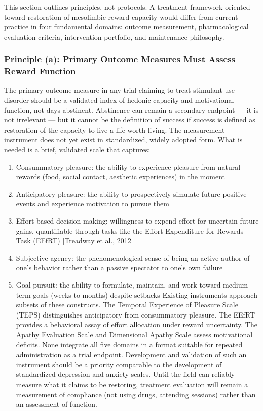 This section outlines principles, not protocols. A treatment framework oriented toward restoration of mesolimbic reward capacity would differ from current practice in four fundamental domains: outcome measurement, pharmacological evaluation criteria, intervention portfolio, and maintenance philosophy.

\subsubsection{Principle (a): Primary Outcome Measures Must Assess Reward Function}\label{18_restoration-principle-a-primary-outcome-measures-must-assess-reward-function}

The primary outcome measure in any trial claiming to treat stimulant use disorder should be a validated index of hedonic capacity and motivational function, not days abstinent. Abstinence can remain a secondary endpoint --- it is not irrelevant --- but it cannot be the definition of success if success is defined as restoration of the capacity to live a life worth living. The measurement instrument does not yet exist in standardized, widely adopted form. What is needed is a brief, validated scale that captures:

\begin{enumerate}
\def\labelenumi{\arabic{enumi}.}
\tightlist
\item
  Consummatory pleasure: the ability to experience pleasure from natural rewards (food, social contact, aesthetic experiences) in the moment\\
\item
  Anticipatory pleasure: the ability to prospectively simulate future positive events and experience motivation to pursue them\\
\item
  Effort-based decision-making: willingness to expend effort for uncertain future gains, quantifiable through tasks like the Effort Expenditure for Rewards Task (EEfRT) {[}Treadway et al., 2012{]}\\
\item
  Subjective agency: the phenomenological sense of being an active author of one's behavior rather than a passive spectator to one's own failure\\
\item
  Goal pursuit: the ability to formulate, maintain, and work toward medium-term goals (weeks to months) despite setbacks Existing instruments approach subsets of these constructs. The Temporal Experience of Pleasure Scale (TEPS) distinguishes anticipatory from consummatory pleasure. The EEfRT provides a behavioral assay of effort allocation under reward uncertainty. The Apathy Evaluation Scale and Dimensional Apathy Scale assess motivational deficits. None integrate all five domains in a format suitable for repeated administration as a trial endpoint. Development and validation of such an instrument should be a priority comparable to the development of standardized depression and anxiety scales. Until the field can reliably measure what it claims to be restoring, treatment evaluation will remain a measurement of compliance (not using drugs, attending sessions) rather than an assessment of function.
\end{enumerate}

